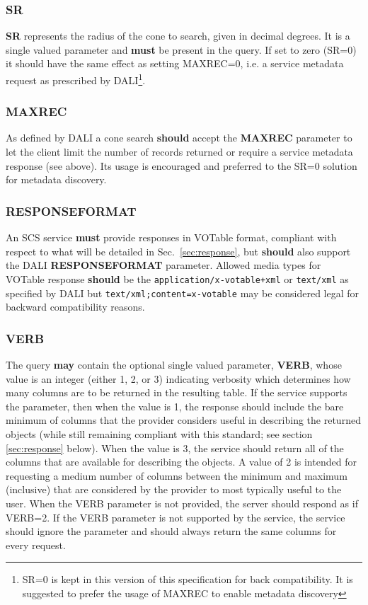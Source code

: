 \documentclass[11pt,a4paper]{ivoa}
\begin{document}
\subsubsection{SR}
\textbf{SR} represents the radius of the cone to search, given in decimal degrees. It is a single valued parameter and \textbf{must} be present in the query. If set to zero (SR=0) it should have the same effect as setting MAXREC=0, i.e. a service metadata request as prescribed by DALI\footnote{SR=0 is kept in this version of this specification for back compatibility. It is suggested to prefer the usage of MAXREC to enable metadata discovery}.

\subsubsection{MAXREC}
As defined by DALI a cone search \textbf{should} accept the \textbf{MAXREC} parameter to let the client limit the number of records returned or require a service metadata response (see above).  Its usage is encouraged and preferred to the SR=0 solution for metadata discovery.

\subsubsection{RESPONSEFORMAT}
\label{subsubsec:responseformat}
An SCS service \textbf{must} provide responses in VOTable \citep{std:VOTABLE} format, compliant with respect to what will be detailed in Sec.~\ref{sec:response}, but \textbf{should} also support the DALI \textbf{RESPONSEFORMAT} parameter. Allowed media types for VOTable response \textbf{should} be the \texttt{application/x-votable+xml} or \texttt{text/xml} as specified by DALI but \texttt{text/xml;content=x-votable} may be considered legal for backward compatibility reasons.

\subsubsection{VERB}
The query \textbf{may} contain the optional single valued parameter, \textbf{VERB}, whose value is an integer (either 1, 2, or 3) indicating verbosity which determines how many columns are to be returned in the resulting table. If the service supports the parameter, then when the value is 1, the response should include the bare minimum of columns that the provider considers useful in describing the returned objects (while still remaining compliant with this standard; see section \ref{sec:response} below). When the value is 3, the service should return all of the columns that are available for describing the objects. A value of 2 is intended for requesting a medium number of columns between the minimum and maximum (inclusive) that are considered by the provider to most typically useful to the user. When the VERB parameter is not provided, the server should respond as if VERB=2. If the VERB parameter is not supported by the service, the service should ignore the parameter and should always return the same columns for every request.
\end{document}
